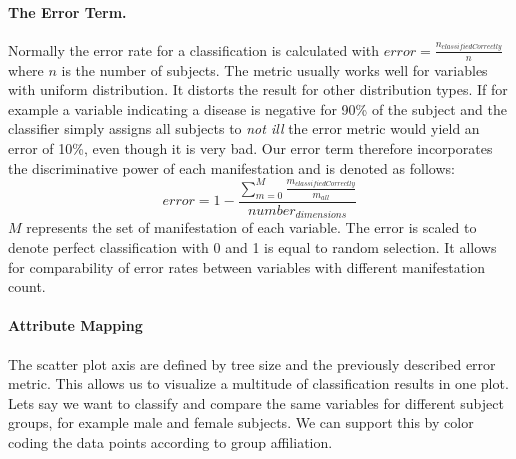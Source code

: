 \documentclass[a4paper,twoside]{style/article}
\begin{document}
\paragraph{The Error Term. }
Normally the error rate for a classification is calculated with $error = \frac{n_{classifiedCorrectly}} {n}$ where $n$ is the number of subjects.
The metric usually works well for variables with uniform distribution.
It distorts the result for other distribution types.
If for example a variable indicating a disease is negative for 90\% of the subject and the classifier simply assigns all subjects to \emph{not ill} the error metric would yield an error of 10\%, even though it is very bad.
Our error term therefore incorporates the discriminative power of each manifestation and is denoted as follows:
\begin{equation}
error = 1 - \frac{\sum_{m=0}^M \frac{m_{classifiedCorrectly}}{m_{all}}}{number_{dimensions}}
\end{equation}
$M$ represents the set of manifestation of each variable.
The error is scaled to denote perfect classification with 0 and 1 is equal to random selection.
It allows for comparability of error rates between variables with different manifestation count.

\paragraph{Attribute Mapping}
The scatter plot axis are defined by tree size and the previously described error metric.
This allows us to visualize a multitude of classification results in one plot.
Lets say we want to classify and compare the same variables for different subject groups, for example male and female subjects.
We can support this by color coding the data points according to group affiliation.
\end{document}
